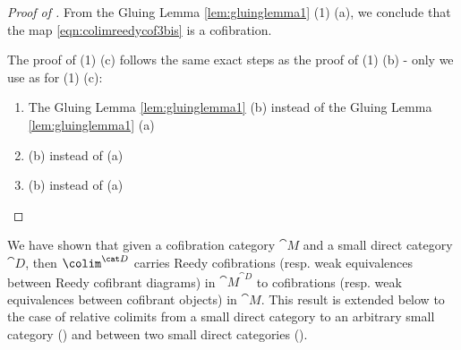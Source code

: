 \begin{proof}[Proof of ]
From the Gluing Lemma \ref{lem:gluinglemma1} (1) (a), we conclude that the map \eqref{eqn:colimreedycof3bis} is a cofibration.

The proof of (1) (c) follows the same exact steps as the proof of (1) (b) - only we use as for  (1) (c):
\begin{enumerate}
\item[-]
The Gluing Lemma \ref{lem:gluinglemma1} (b) instead of the Gluing Lemma \ref{lem:gluinglemma1} (a)
\item[-]
 (b) instead of (a)
\item[-]
 (b) instead of (a)
\end{enumerate}
\end{proof}

We have shown that given a cofibration category ${\cat M}$ and a small direct category ${\cat D}$, then $\colim^{\cat D}$ carries Reedy cofibrations (resp. weak equivalences between Reedy cofibrant diagrams) in ${\cat M}^{\cat D}$ to cofibrations (resp. weak equivalences between cofibrant objects) in ${\cat M}$. This result is extended below to the case of relative colimits from a small direct category to an arbitrary small category () and between two small direct categories (). 

